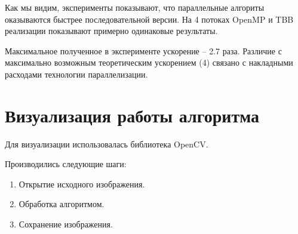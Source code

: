 \documentclass{report}
\begin{document}
Как мы видим, эксперименты показывают, что параллельные алгориты оказываются быстрее последовательной версии. На 4 потоках OpenMP и TBB реализации показывают примерно одинаковые результаты.

Максимальное полученное в эксперименте ускорение -- 2.7 раза. Различие с максимально возможным теоретическим ускорением (4) связано с накладными расходами технологии параллелизации.
\newpage


\section*{Визуализация работы алгоритма}

Для визуализации использовалась библиотека OpenCV.

Производились следующие шаги:
\begin{enumerate}
    \item Открытие исходного изображения.
    \item Обработка алгоритмом.
    \item Сохранение изображения. 
\end{enumerate}

\begin{figure}[H]
    \centering
    \qquad
\end{figure}
\end{document}
